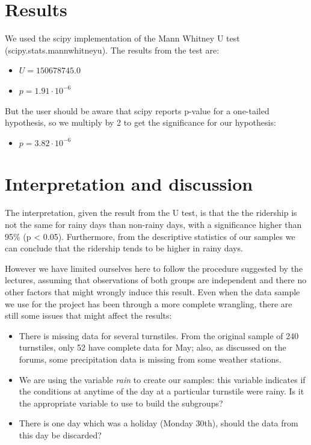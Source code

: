 \documentclass[letterpaper,10pt,english]{sphinxmanual}
\begin{document}
\section{Results}
\label{section1:results}
We used the scipy implementation of the Mann Whitney U test
(scipy.stats.mannwhitneyu). The results from the test are:
\begin{itemize}
\item {} 
\(U = 150678745.0\)

\item {} 
\(p = 1.91 \cdot 10^{-6}\)

\end{itemize}

But the user should be aware that scipy reports p-value for a one-tailed
hypothesis, so we multiply by 2 to get the significance for our hypothesis:
\begin{itemize}
\item {} 
\(p = 3.82 \cdot 10^{-6}\)

\end{itemize}


\section{Interpretation and discussion}
\label{section1:interpretation-and-discussion}
The interpretation, given the result from the U test, is that the the ridership
is not the same for rainy days than non-rainy days, with a significance higher
than 95\% (p \textless{} 0.05). Furthermore, from the descriptive statistics of our samples
we can conclude that the ridership tends to be higher in rainy days.

However we have limited ourselves here to follow the procedure suggested by the
lectures, assuming that observations of both groups are independent and there
no other factors that might wrongly induce this result. Even when the data sample
we use for the project has been through a more complete wrangling, there are
still some issues that might affect the results:
\begin{itemize}
\item {} 
There is missing data for several turnstiles. From the original sample of 240
turnstiles, only 52 have complete data for May; also, as discussed on the forums,
some precipitation data is missing from some weather stations.

\item {} 
We are using the variable \emph{rain} to create our samples: this variable
indicates if the conditions at anytime of the day at a
particular turnstile were rainy. Is it the appropriate variable to use to
build the subgroups?

\item {} 
There is one day which was a holiday (Monday 30th), should the data from this
day be discarded?

\end{itemize}
\end{document}

